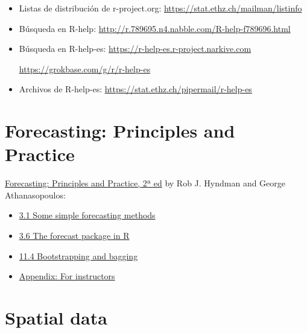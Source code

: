 \documentclass[]{book}
\theoremstyle{break}
\theoremstyle{definition}
\theoremstyle{definition}
\theoremstyle{definition}
\theoremstyle{remark}
\begin{document}
\begin{itemize}
  \begin{itemize}
  \item
    Listas de distribución de r-project.org:
    \url{https://stat.ethz.ch/mailman/listinfo}
  \item
    Búsqueda en R-help:
    \url{http://r.789695.n4.nabble.com/R-help-f789696.html}
  \item
    Búsqueda en R-help-es: \url{https://r-help-es.r-project.narkive.com}

    \url{https://grokbase.com/g/r/r-help-es}
  \item
    Archivos de R-help-es:
    \url{https://stat.ethz.ch/pipermail/r-help-es}
  \end{itemize}
\end{itemize}

\section{Forecasting: Principles and Practice}\label{forecast-links}

\href{https://otexts.com/fpp2}{Forecasting: Principles and Practice, 2ª
ed} by Rob J. Hyndman and George Athanasopoulos:

\begin{itemize}
\item
  \href{https://otexts.com/fpp2/simple-methods.html}{3.1 Some simple
  forecasting methods}
\item
  \href{https://otexts.com/fpp2/the-forecast-package-in-r.html}{3.6 The
  forecast package in R}
\item
  \href{https://otexts.com/fpp2/bootstrap.html}{11.4 Bootstrapping and
  bagging}
\item
  \href{https://otexts.com/fpp2/appendix-for-instructors.html}{Appendix:
  For instructors}
\end{itemize}

\section{Spatial data}\label{spatial-links}
\end{document}
